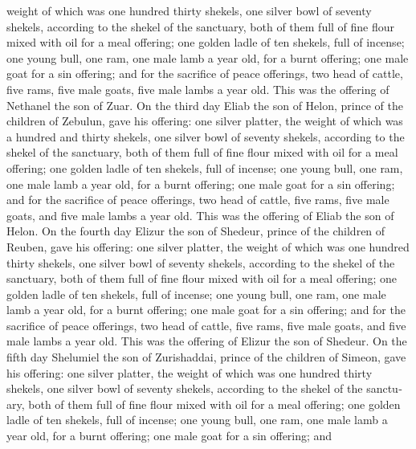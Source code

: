 \begin{paracol}{2}
\begin{otherlanguage}{english}
weight of which was one hundred thirty shekels, one silver bowl of
seventy shekels, according to the shekel of the sanctuary, both of them
full of fine flour mixed with oil for a meal offering; 
one golden ladle of ten shekels, full of incense;  one
young bull, one ram, one male lamb a year old, for a burnt offering;
 one male goat for a sin offering;  and
for the sacrifice of peace offerings, two head of cattle, five rams,
five male goats, five male lambs a year old. This was the offering of
Nethanel the son of Zuar.  On the third day Eliab the son
of Helon, prince of the children of Zebulun,  gave his
offering: one silver platter, the weight of which was a hundred and
thirty shekels, one silver bowl of seventy shekels, according to the
shekel of the sanctuary, both of them full of fine flour mixed with oil
for a meal offering;  one golden ladle of ten shekels,
full of incense;  one young bull, one ram, one male lamb
a year old, for a burnt offering;  one male goat for a
sin offering;  and for the sacrifice of peace offerings,
two head of cattle, five rams, five male goats, and five male lambs a
year old. This was the offering of Eliab the son of Helon.
 On the fourth day Elizur the son of Shedeur, prince of
the children of Reuben,  gave his offering: one silver
platter, the weight of which was one hundred thirty shekels, one silver
bowl of seventy shekels, according to the shekel of the sanctuary, both
of them full of fine flour mixed with oil for a meal offering;
 one golden ladle of ten shekels, full of incense;
 one young bull, one ram, one male lamb a year old, for a
burnt offering;  one male goat for a sin offering;
 and for the sacrifice of peace offerings, two head of
cattle, five rams, five male goats, and five male lambs a year old. This
was the offering of Elizur the son of Shedeur.  On the
fifth day Shelumiel the son of Zurishaddai, prince of the children of
Simeon,  gave his offering: one silver platter, the
weight of which was one hundred thirty shekels, one silver bowl of
seventy shekels, according to the shekel of the sanctuary, both of them
full of fine flour mixed with oil for a meal offering; 
one golden ladle of ten shekels, full of incense;  one
young bull, one ram, one male lamb a year old, for a burnt offering;
 one male goat for a sin offering;  and

\end{otherlanguage}
\end{paracol}
